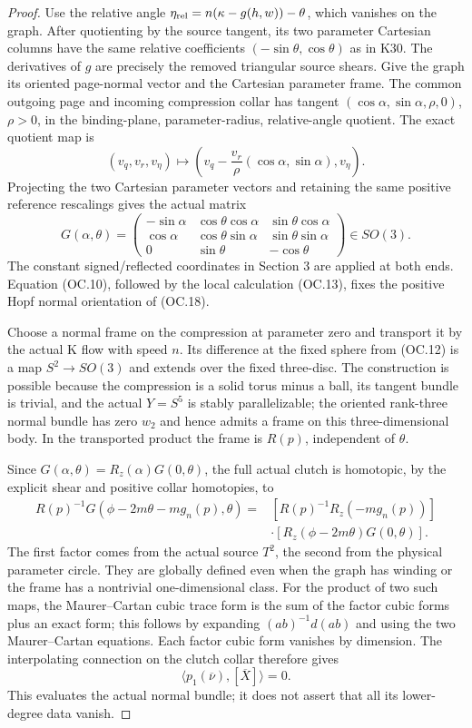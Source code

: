 \begin{proof}
Use the relative angle
\(\eta_{\rm rel}=n(\kappa-g(h,w))-\theta\), which vanishes on the graph.
After quotienting by the source tangent, its two parameter Cartesian
columns have the same relative coefficients \((-\sin \theta,\cos \theta)\)
as in K30. The derivatives of \(g\) are precisely the removed triangular
source shears. Give the graph its oriented page-normal vector and the
Cartesian parameter frame. The common outgoing page and incoming
compression collar has tangent
\((\cos \alpha,\sin \alpha,\rho,0)\), \(\rho>0\), in the binding-plane,
parameter-radius, relative-angle quotient. The exact quotient map is
\[
 (v_q,v_r,v_\eta)\longmapsto
 \left(v_q-\frac{v_r}{\rho}(\cos\alpha,\sin\alpha),v_\eta\right).
 \tag{OC.17}
\]
Projecting the two Cartesian parameter vectors and retaining the same
positive reference rescalings gives the actual matrix
\[
 G(\alpha,\theta)=
 \begin{pmatrix}
 -\sin\alpha&\cos\theta\cos\alpha&\sin\theta\cos\alpha\\
 \cos\alpha&\cos\theta\sin\alpha&\sin\theta\sin\alpha\\
 0&\sin\theta&-\cos\theta
 \end{pmatrix}\in SO(3).
 \tag{OC.18}
\]
The constant signed/reflected coordinates in Section 3 are applied
at both ends. Equation (OC.10), followed by the local calculation
(OC.13), fixes the positive Hopf normal orientation of (OC.18).

Choose a normal frame on the compression at parameter zero and
transport it by the actual K flow with speed \(n\). Its difference at
the fixed sphere from (OC.12) is a map \(S^2\longrightarrow SO(3)\) and extends over
the fixed three-disc. The construction is possible because the
compression is a solid torus minus a ball, its tangent bundle is
trivial, and the actual \(Y=S^5\) is stably parallelizable; the oriented
rank-three normal bundle has zero \(w_2\) and hence admits a frame on
this three-dimensional body. In the transported product the frame is
\(R(p)\), independent of \(\theta\).

Since \(G(\alpha,\theta)=R_z(\alpha)G(0,\theta)\), the full actual clutch is
homotopic, by the explicit shear and positive collar homotopies, to
\[
 \begin{split}
 R(p)^{-1}G(\phi-2m\theta-mg_n(p),\theta)
   ={}&[R(p)^{-1}R_z(-mg_n(p))]\\
     &\cdot[R_z(\phi-2m\theta)G(0,\theta)].
 \end{split}
 \tag{OC.19}
\]
The first factor comes from the actual source \(T^2\), the second from
the physical parameter circle. They are globally defined even when
the graph has winding or the frame has a nontrivial one-dimensional
class. For the product of two such maps, the Maurer--Cartan cubic
trace form is the sum of the factor cubic forms plus an exact form;
this follows by expanding \((ab)^{-1}d(ab)\) and using the two
Maurer--Cartan equations. Each factor cubic form vanishes by
dimension. The interpolating connection on the clutch collar
therefore gives
\[
             \langle p_1(\overline\nu),[\overline X]\rangle=0.
 \tag{OC.20}
\]
This evaluates the actual normal bundle; it does not assert that all
its lower-degree data vanish.


\end{proof}
